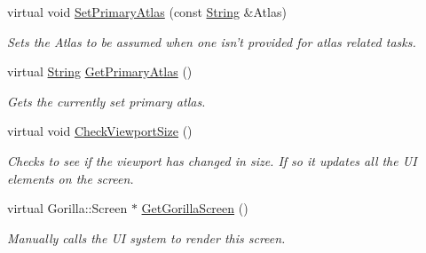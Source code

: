 \begin{DoxyCompactItemize}
virtual void \hyperlink{classphys_1_1UI_1_1Screen_a0797ae5a260b88b253412276db961394}{SetPrimaryAtlas} (const \hyperlink{namespacephys_aa03900411993de7fbfec4789bc1d392e}{String} \&Atlas)
\begin{DoxyCompactList}\small\item\em Sets the Atlas to be assumed when one isn't provided for atlas related tasks. \item\end{DoxyCompactList}\item 
virtual \hyperlink{namespacephys_aa03900411993de7fbfec4789bc1d392e}{String} \hyperlink{classphys_1_1UI_1_1Screen_a2e1c1929e23577e95d6226a58b7602da}{GetPrimaryAtlas} ()
\begin{DoxyCompactList}\small\item\em Gets the currently set primary atlas. \item\end{DoxyCompactList}\item 
\hypertarget{classphys_1_1UI_1_1Screen_a401ab41eafc9417ef57c66ff32c8038c}{
virtual void \hyperlink{classphys_1_1UI_1_1Screen_a401ab41eafc9417ef57c66ff32c8038c}{CheckViewportSize} ()}
\label{classphys_1_1UI_1_1Screen_a401ab41eafc9417ef57c66ff32c8038c}

\begin{DoxyCompactList}\small\item\em Checks to see if the viewport has changed in size. If so it updates all the UI elements on the screen. \item\end{DoxyCompactList}\item 
virtual Gorilla::Screen $\ast$ \hyperlink{classphys_1_1UI_1_1Screen_a6ba3a966f2977cc095355c93d5bec81d}{GetGorillaScreen} ()
\begin{DoxyCompactList}\small\item\em Manually calls the UI system to render this screen. \item\end{DoxyCompactList}\end{DoxyCompactItemize}
